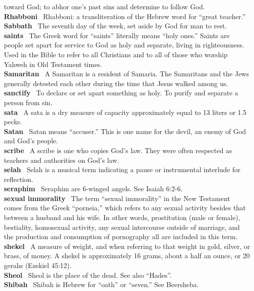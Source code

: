 toward God; to abhor one's past sins and determine to follow God.\\
\textbf{Rhabboni}~ Rhabboni: a transliteration of the Hebrew word for
``great teacher.''\\
\textbf{Sabbath}~ The seventh day of the week, set aside by God for man
to rest.\\
\textbf{saints}~ The Greek word for ``saints'' literally means ``holy
ones.'' Saints are people set apart for service to God as holy and
separate, living in righteousness. Used in the Bible to refer to all
Christians and to all of those who worship Yahweh in Old Testament
times.\\
\textbf{Samaritan}~ A Samaritan is a resident of Samaria. The Samaritans
and the Jews generally detested each other during the time that Jesus
walked among us.\\
\textbf{sanctify}~ To declare or set apart something as holy. To purify
and separate a person from sin.\\
\textbf{sata}~ A sata is a dry measure of capacity approximately equal
to 13 liters or 1.5 pecks.\\
\textbf{Satan}~ Satan means ``accuser.'' This is one name for the devil,
an enemy of God and God's people.\\
\textbf{scribe}~ A scribe is one who copies God's law. They were often
respected as teachers and authorities on God's law.\\
\textbf{selah}~ Selah is a musical term indicating a pause or
instrumental interlude for reflection.\\
\textbf{seraphim}~ Seraphim are 6-winged angels. See Isaiah 6:2-6.\\
\textbf{sexual immorality}~ The term ``sexual immorality'' in the New
Testament comes from the Greek ``porneia,'' which refers to any sexual
activity besides that between a husband and his wife. In other words,
prostitution (male or female), bestiality, homosexual activity, any
sexual intercourse outside of marriage, and the production and
consumption of pornography all are included in this term.\\
\textbf{shekel}~ A measure of weight, and when referring to that weight
in gold, silver, or brass, of money. A shekel is approximately 16 grams,
about a half an ounce, or 20 gerahs (Ezekiel 45:12).\\
\textbf{Sheol}~ Sheol is the place of the dead. See also ``Hades''.\\
\textbf{Shibah}~ Shibah is Hebrew for ``oath'' or ``seven.'' See
Beersheba.\\
